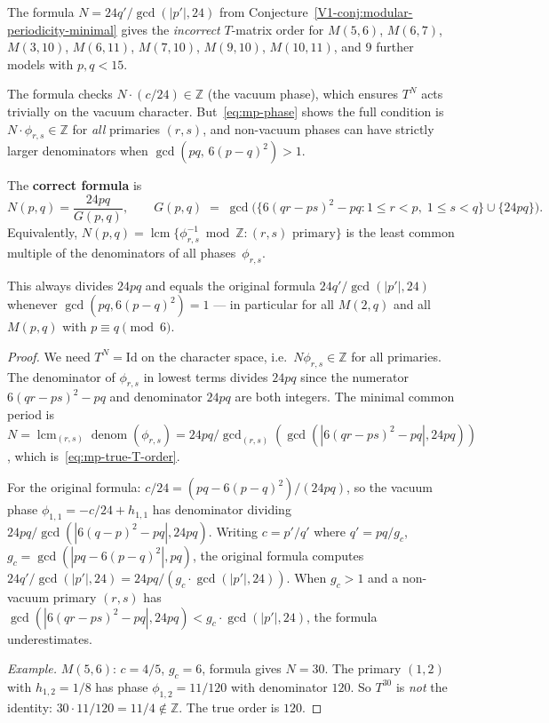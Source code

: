 \documentclass[11pt]{article}
\newcommand{\Z}{\mathbb{Z}}
\begin{document}
\begin{computation}
\label{comp:T-period-correction}
The formula $N = 24q'/\gcd(|p'|,24)$ from
Conjecture~\textup{\ref*{V1-conj:modular-periodicity-minimal}}
gives the \emph{incorrect} $T$-matrix order for
$M(5,6)$, $M(6,7)$, $M(3,10)$, $M(6,11)$, $M(7,10)$, $M(9,10)$,
$M(10,11)$, and $9$ further models with $p,q < 15$.

The formula checks $N \cdot (c/24) \in \Z$ (the vacuum phase), which
ensures $T^N$ acts trivially on the vacuum character.
But~\eqref{eq:mp-phase} shows the full condition is
$N \cdot \phi_{r,s} \in \Z$ for \emph{all} primaries $(r,s)$,
and non-vacuum phases can have strictly larger denominators when
$\gcd(pq,\, 6(p-q)^2) > 1$.

The \textbf{correct formula} is
\begin{equation}\label{eq:mp-true-T-order}
\boxed{
N(p,q) = \frac{24pq}{G(p,q)},
\qquad
G(p,q) \;=\; \gcd\bigl(\{6(qr-ps)^2 - pq
  : 1 \le r < p,\; 1 \le s < q\}
  \cup \{24pq\}\bigr).
}
\end{equation}
Equivalently, $N(p,q) = \operatorname{lcm}\{\phi_{r,s}^{-1}
\bmod \Z : (r,s)\text{ primary}\}$ is the least common multiple
of the denominators of all phases~$\phi_{r,s}$.

This always divides $24pq$ and equals the original formula
$24q'/\gcd(|p'|,24)$ whenever $\gcd(pq, 6(p-q)^2) = 1$
--- in particular for all $M(2,q)$ and all $M(p,q)$ with
$p \equiv q \pmod{6}$.
\end{computation}

\begin{proof}
We need $T^N = \mathrm{Id}$ on the character space,
i.e.\ $N\phi_{r,s} \in \Z$ for all primaries.
The denominator of $\phi_{r,s}$ in lowest terms
divides $24pq$ since the numerator $6(qr-ps)^2 - pq$
and denominator $24pq$ are both integers.
The minimal common period is
$N = \operatorname{lcm}_{(r,s)} \operatorname{denom}(\phi_{r,s})
= 24pq / \gcd_{(r,s)}(\gcd(|6(qr-ps)^2 - pq|, 24pq))$,
which is~\eqref{eq:mp-true-T-order}.

For the original formula:
$c/24 = (pq - 6(p-q)^2)/(24pq)$, so the vacuum phase
$\phi_{1,1} = -c/24 + h_{1,1}$ has denominator dividing
$24pq/\gcd(|6(q-p)^2 - pq|, 24pq)$.
Writing $c = p'/q'$ where $q' = pq/g_c$,
$g_c = \gcd(|pq-6(p-q)^2|, pq)$, the original formula computes
$24q'/\gcd(|p'|,24) = 24pq / (g_c \cdot \gcd(|p'|,24))$.
When $g_c > 1$ and a non-vacuum primary $(r,s)$ has
$\gcd(|6(qr-ps)^2-pq|, 24pq) < g_c \cdot \gcd(|p'|,24)$,
the formula underestimates.

\emph{Example.}
$M(5,6)$: $c = 4/5$, $g_c = 6$, formula gives $N = 30$.
The primary $(1,2)$ with $h_{1,2} = 1/8$ has phase
$\phi_{1,2} = 11/120$ with denominator $120$.
So $T^{30}$ is \emph{not} the identity: $30 \cdot 11/120 = 11/4
\notin \Z$.  The true order is $120$.
\end{proof}
\end{document}
